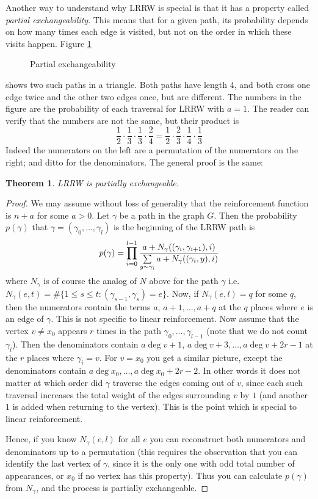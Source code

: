 \documentclass{emsprocart}
\theoremstyle{plain}
\newtheorem{thm}{Theorem}
\begin{document}
Another way to understand why LRRW is special is that it has a property
called \emph{partial exchangeability}. This means that for a given
path, its probability depends on how many times each edge is visited,
but not on the order in which these visits happen. Figure \ref{fig:Partial-exchangeability}
\begin{figure}
\centering

\caption{\label{fig:Partial-exchangeability}Partial exchangeability}
\end{figure}
 shows two such paths in a triangle. Both paths have length 4, and
both cross one edge twice and the other two edges once, but are different.
The numbers in the figure are the probability of each traversal for
LRRW with $a=1$. The reader can verify that the numbers are not the
same, but their product is
\[
\frac{1}{2}\cdot\frac{1}{3}\cdot\frac{1}{3}\cdot\frac{2}{4}=\frac{1}{2}\cdot\frac{2}{3}\cdot\frac{1}{4}\cdot\frac{1}{3}
\]
Indeed the numerators on the left are a permutation of the numerators
on the right; and ditto for the denominators. The general proof is
the same:
\begin{thm}
LRRW is partially exchangeable.\end{thm}
\begin{proof}
We may assume without loss of generality that the reinforcement function
is $n+a$ for some $a>0$. Let $\gamma$ be a path in the graph $G$.
Then the probability $p(\gamma)$ that $\gamma=(\gamma_{0},\dotsc,\gamma_{l})$
is the beginning of the LRRW path is
\[
p(\gamma)=\prod_{i=0}^{l-1}\frac{a+N_{\gamma}((\gamma_{i},\gamma_{i+1}),i)}{\sum\limits _{\smash{y\sim\gamma_{i}}}a+N_{\gamma}((\gamma_{i},y),i)}
\]
where $N_{\gamma}$ is of course the analog of $N$ above for the
path $\gamma$ i.e.\ $N_{\gamma}(e,t)=\#\{1\le s\le t:(\gamma_{s-1},\gamma_{s})=e\}$.
Now, if $N_{\gamma}(e,l)=q$ for some $q$, then the numerators contain
the terms $a$, $a+1,\dotsc,a+q$ at the $q$ places where $e$ is
an edge of $\gamma$. This is not specific to linear reinforcement.
Now assume that the vertex $v\ne x_{0}$ appears $r$ times in the
path $\gamma_{0},\dotsc,\gamma_{l-1}$ (note that we do not count
$\gamma_{l}$).  Then the denominators contain $a\deg v+1$, $a\deg v+3,\dotsc,a\deg v+2r-1$
at the $r$ places where $\gamma_{i}=v$. For $v=x_{0}$ you get a
similar picture, except the denominators contain $a\deg x_{0},\dotsc,a\deg x_{0}+2r-2$.
In other words it does not matter at which order did $\gamma$ traverse
the edges coming out of $v$, since each such traversal increases
the total weight of the edges surrounding $v$ by $1$ (and another
$1$ is added when returning to the vertex). This is the point which
is special to linear reinforcement. 

Hence, if you know $N_{\gamma}(e,l)$ for all $e$ you can reconstruct
both numerators and denominators up to a permutation (this requires
the observation that you can identify the last vertex of $\gamma$,
since it is the only one with odd total number of appearances, or
$x_{0}$ if no vertex has this property). Thus you can calculate $p(\gamma)$
from $N_{\gamma}$, and the process is partially exchangeable.
\end{proof}
\end{document}
